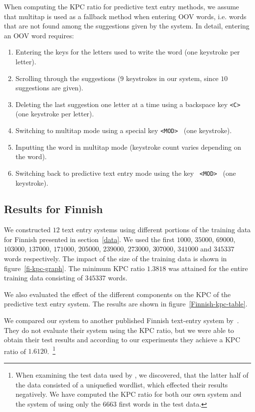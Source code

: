 \documentclass{llncs}
\begin{document}
When computing the KPC ratio for predictive text entry methods, we assume
that multitap is used as a fallback method when entering OOV words,
i.e. words that are not found among the suggestions given by the
system. In detail, entering an OOV word requires:
\begin{enumerate}
\item Entering the keys for the letters used to write the word (one
  keystroke per letter).
\item Scrolling through the suggestions ($9$ keystrokes in our system,
  since $10$ suggestions are given).
\item Deleting the last suggestion one letter at a time using a
  backspace key {\tt <C> } (one keystroke per letter).
\item Switching to multitap mode using a special key {\tt <MOD> } (one
  keystroke).
\item Inputting the word in multitap mode (keystroke count varies
  depending on the word).
\item Switching back to predictive text entry mode using the key {\tt
  <MOD> } (one keystroke).
\end{enumerate}

\subsection{Results for Finnish}

We constructed $12$ text entry systems using different portions of the
training data for Finnish presented in section~\ref{data}. We used the
first $1000$, $35000$, $69000$, $103000$, $137000$, $171000$,
$205000$, $239000$, $273000$, $307000$, $341000$ and $345337$ words
respectively. The impact of the size of the training data is shown in
figure~\ref{fi-kpc-graph}. The minimum KPC ratio $1.3818$ was attained
for the entire training data consisting of $345337$ words.

We also evaluated the effect of the different components on the KPC of
the predictive text entry system. The results are shown in
figure~\ref{Finnish-kpc-table}.

We compared our system to another published Finnish text-entry system
by~\cite{silfverberg/2011/cla}.  They do not evaluate their system
using the KPC ratio, but we were able to obtain their test results and
according to our experiments they achieve a KPC ratio of
$1.6120$.~\footnote{When examining the test data used by
  \cite{silfverberg/2011/cla}, we discovered, that the latter half of
  the data consisted of a uniquefied wordlist, which effected their
  results negatively. We have computed the KPC ratio for both our own
  system and the system of \cite{silfverberg/2011/cla} using only the
  $6663$ first words in the test data.}
\end{document}

